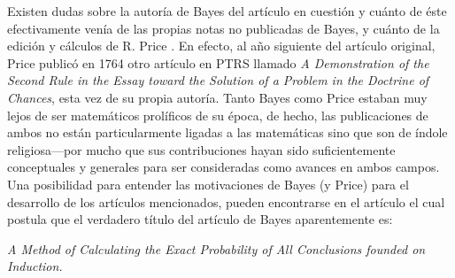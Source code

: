 \begin{mdframed}[style=discusion, frametitle={\center ¿Qué hizo efectivamente Bayes y por qué?}]
Existen dudas sobre la autoría de Bayes del artículo en cuestión y cuánto de éste efectivamente venía de las propias notas no publicadas de Bayes, y cuánto de la edición y cálculos de R. Price \cite{bellhouse_2004}. En efecto, al año siguiente del artículo original, Price publicó en 1764 otro artículo en PTRS llamado \emph{A Demonstration of the Second Rule in the Essay toward the Solution of a Problem in the Doctrine of Chances}, esta vez de su propia autoría. Tanto Bayes como Price estaban muy lejos de ser  matemáticos prolíficos de su época, de hecho, las publicaciones de ambos no están particularmente ligadas a las matemáticas sino que son de índole religiosa---por mucho que sus contribuciones hayan sido suficientemente  conceptuales y generales para ser consideradas como avances en ambos campos. Una posibilidad para entender las motivaciones de Bayes (y Price) para el desarrollo de los artículos mencionados, pueden encontrarse en el artículo \cite{stigler2013} el cual postula que el verdadero título del artículo de Bayes aparentemente es: 
\begin{center}
\it
A Method of Calculating the Exact Probability of All Conclusions founded on Induction.
\end{center}

\end{mdframed}
